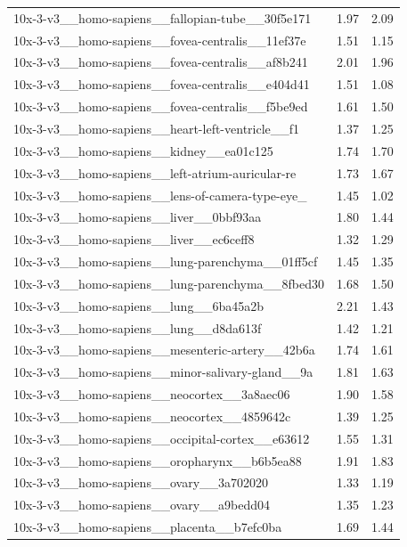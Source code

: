 \begin{table}[H]
{\begin{tabular}{lrr}
10x-3-v3\_\_homo-sapiens\_\_fallopian-tube\_\_30f5e171 & 1.97 & 2.09 \\
10x-3-v3\_\_homo-sapiens\_\_fovea-centralis\_\_11ef37e & 1.51 & 1.15 \\
10x-3-v3\_\_homo-sapiens\_\_fovea-centralis\_\_af8b241 & 2.01 & 1.96 \\
10x-3-v3\_\_homo-sapiens\_\_fovea-centralis\_\_e404d41 & 1.51 & 1.08 \\
10x-3-v3\_\_homo-sapiens\_\_fovea-centralis\_\_f5be9ed & 1.61 & 1.50 \\
10x-3-v3\_\_homo-sapiens\_\_heart-left-ventricle\_\_f1 & 1.37 & 1.25 \\
10x-3-v3\_\_homo-sapiens\_\_kidney\_\_ea01c125 & 1.74 & 1.70 \\
10x-3-v3\_\_homo-sapiens\_\_left-atrium-auricular-re & 1.73 & 1.67 \\
10x-3-v3\_\_homo-sapiens\_\_lens-of-camera-type-eye\_ & 1.45 & 1.02 \\
10x-3-v3\_\_homo-sapiens\_\_liver\_\_0bbf93aa & 1.80 & 1.44 \\
10x-3-v3\_\_homo-sapiens\_\_liver\_\_ec6ceff8 & 1.32 & 1.29 \\
10x-3-v3\_\_homo-sapiens\_\_lung-parenchyma\_\_01ff5cf & 1.45 & 1.35 \\
10x-3-v3\_\_homo-sapiens\_\_lung-parenchyma\_\_8fbed30 & 1.68 & 1.50 \\
10x-3-v3\_\_homo-sapiens\_\_lung\_\_6ba45a2b & 2.21 & 1.43 \\
10x-3-v3\_\_homo-sapiens\_\_lung\_\_d8da613f & 1.42 & 1.21 \\
10x-3-v3\_\_homo-sapiens\_\_mesenteric-artery\_\_42b6a & 1.74 & 1.61 \\
10x-3-v3\_\_homo-sapiens\_\_minor-salivary-gland\_\_9a & 1.81 & 1.63 \\
10x-3-v3\_\_homo-sapiens\_\_neocortex\_\_3a8aec06 & 1.90 & 1.58 \\
10x-3-v3\_\_homo-sapiens\_\_neocortex\_\_4859642c & 1.39 & 1.25 \\
10x-3-v3\_\_homo-sapiens\_\_occipital-cortex\_\_e63612 & 1.55 & 1.31 \\
10x-3-v3\_\_homo-sapiens\_\_oropharynx\_\_b6b5ea88 & 1.91 & 1.83 \\
10x-3-v3\_\_homo-sapiens\_\_ovary\_\_3a702020 & 1.33 & 1.19 \\
10x-3-v3\_\_homo-sapiens\_\_ovary\_\_a9bedd04 & 1.35 & 1.23 \\
10x-3-v3\_\_homo-sapiens\_\_placenta\_\_b7efc0ba & 1.69 & 1.44 \\

\end{tabular}}
\end{table}
